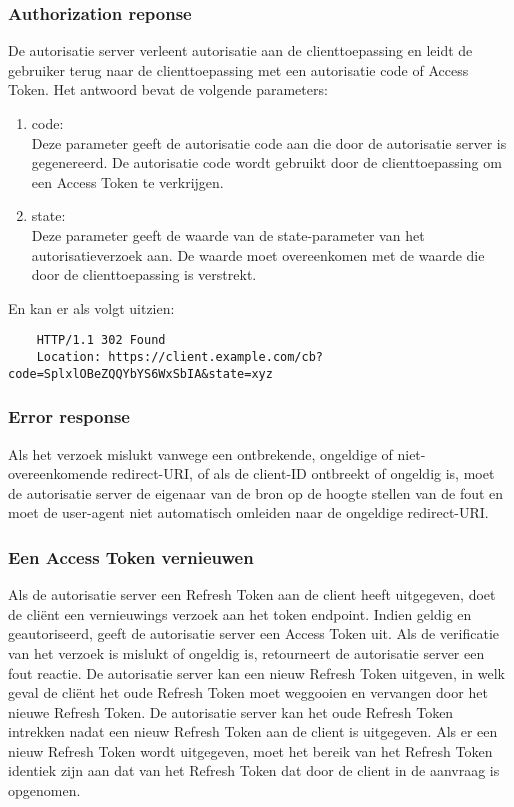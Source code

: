 \subsubsection{Authorization reponse}%
\label{subsubsec:authorization-reponse}
De autorisatie server verleent autorisatie aan de clienttoepassing en leidt de gebruiker terug naar de clienttoepassing met een autorisatie code of Access Token. Het antwoord bevat de volgende parameters:
\begin{enumerate}[label=\textbf{-}]
    \item code: \\
    Deze parameter geeft de autorisatie code aan die door de autorisatie server is gegenereerd. De autorisatie code wordt gebruikt door de clienttoepassing om een Access Token te verkrijgen.
  
    \item state: \\
    Deze parameter geeft de waarde van de state-parameter van het autorisatieverzoek aan. De waarde moet overeenkomen met de waarde die door de clienttoepassing is verstrekt.
  \end{enumerate}
  En kan er als volgt uitzien:
  \begin{verbatim}
    HTTP/1.1 302 Found
    Location: https://client.example.com/cb?code=SplxlOBeZQQYbYS6WxSbIA&state=xyz
  \end{verbatim}

  \subsubsection{Error response}%
  \label{subsubsec:error-response}
  Als het verzoek mislukt vanwege een ontbrekende, ongeldige of niet-overeenkomende redirect-URI, of als de client-ID ontbreekt of ongeldig is, moet de autorisatie server de eigenaar van de bron op de hoogte stellen van de fout en moet de user-agent niet automatisch omleiden naar de ongeldige redirect-URI.
  
  \subsubsection{Een Access Token vernieuwen}%
  \label{subsubsec:een-access-token-vernieuwen}
  Als de autorisatie server een Refresh Token aan de client heeft uitgegeven, doet de cliënt een vernieuwings verzoek aan het token endpoint.
  Indien geldig en geautoriseerd, geeft de autorisatie server een Access Token uit. Als de verificatie van het verzoek is mislukt of ongeldig is, retourneert de autorisatie server een fout reactie.
  De autorisatie server kan een nieuw Refresh Token uitgeven, in welk geval de cliënt het oude Refresh Token moet weggooien en vervangen door het nieuwe Refresh Token. De autorisatie server kan het oude Refresh Token intrekken nadat een nieuw Refresh Token aan de client is uitgegeven. Als er een nieuw Refresh Token wordt uitgegeven, moet het bereik van het Refresh Token identiek zijn aan dat van het Refresh Token dat door de client in de aanvraag is opgenomen.
  
